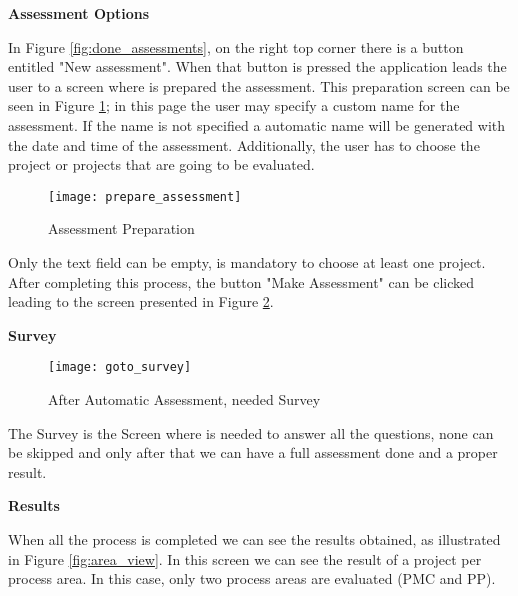 \vspace{10 mm}

\textbf{Assessment Options}

In Figure \ref{fig:done_assessments}, on the right top corner there is a button entitled "New assessment". When that button is pressed the application leads the user to a screen where is prepared the assessment. This preparation screen can be seen in Figure \ref{fig:prepare_assessment}; in this page the user may specify a custom name for the assessment. If the name is not specified a automatic name will be generated with the date and time of the assessment. Additionally, the user has to choose the project or projects that are going to be evaluated.

\begin{figure}[!htb]
	\begin{center}
		\leavevmode
		\texttt{[image: prepare\_assessment]}
		\caption{Assessment Preparation}
		\label{fig:prepare_assessment}
	\end{center}
\end{figure}

Only the text field can be empty, is mandatory to choose at least one project. After completing this process, the button "Make Assessment" can be clicked leading to the screen presented in Figure \ref{fig:goto_survey}.

\vspace{10 mm}

\textbf{Survey}

\begin{figure}[!htb]
	\begin{center}
		\leavevmode
		\texttt{[image: goto\_survey]}
		\caption{After Automatic Assessment, needed Survey}
		\label{fig:goto_survey}
	\end{center}
\end{figure}

The Survey is the Screen where is needed to answer all the questions, none can be skipped and only after that we can have a full assessment done and a proper result.

\vspace{10 mm}

\textbf{Results}

When all the process is completed we can see the results obtained, as illustrated in Figure \ref{fig:area_view}. In this screen we can see the result of a project per process area. In this case, only two process areas are evaluated (PMC and PP).

